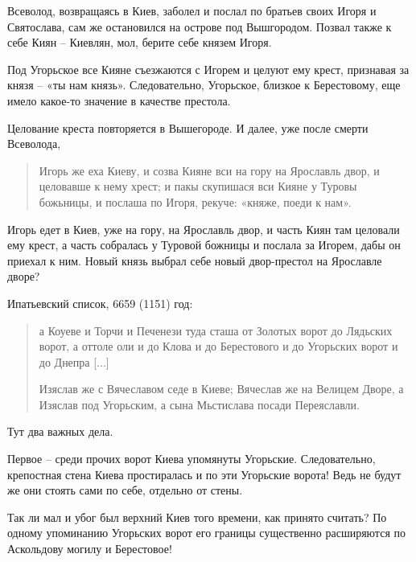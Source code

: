 \documentclass[a5paper,11pt,openany]{article}
\begin{document}
Всеволод, возвращаясь в Киев, заболел и послал по братьев своих Игоря и Святослава, сам же остановился на острове под Вышгородом. Позвал также к себе Киян – Киевлян, мол, берите себе князем Игоря.

Под Угорьское все Кияне съезжаются с Игорем и целуют ему крест, признавая за князя – «ты нам князь». Следовательно, Угорьское, близкое к Берестовому, еще имело какое-то значение в качестве престола.

Целование креста повторяется в Вышегороде. И далее, уже после смерти Всеволода, 

\begin{quotation}
\noindent Игорь же еха Киеву, и созва Кияне вси на гору на Ярославль двор, и целовавше к нему хрест; и пакы скупишася вси Кияне у Туровы божьницы, и послаша по Игоря, рекуче: «княже, поеди к нам».
\end{quotation}

Игорь едет в Киев, уже на гору, на Ярославль двор, и часть Киян там целовали ему крест, а часть собралась у Туровой божницы и послала за Игорем, дабы он приехал к ним. Новый князь выбрал себе новый двор-престол на Ярославле дворе?




Ипатьевский список, 6659 (1151) год:

\begin{quotation}
\noindent а Коуеве и Торчи и Печенези туда сташа от Золотых ворот до Лядьских ворот, а оттоле оли и до Клова и до Берестового и до Угорьских ворот и до Днепра [...]

Изяслав же с Вячеславом седе в Киеве; Вячеслав же на Велицем Дворе, а Изяслав под Угорьским, а сына Мьстислава посади Переяславли.
\end{quotation}

Тут два важных дела. 

Первое – среди прочих ворот Киева упомянуты Угорьские. Следовательно, крепостная стена Киева простиралась и по эти Угорьские ворота! Ведь не будут же они стоять сами по себе, отдельно от стены.

Так ли мал и убог был верхний Киев того времени, как принято считать? По одному упоминанию Угорьских ворот его границы существенно расширяются по Аскольдову могилу и Берестовое!
\end{document}

